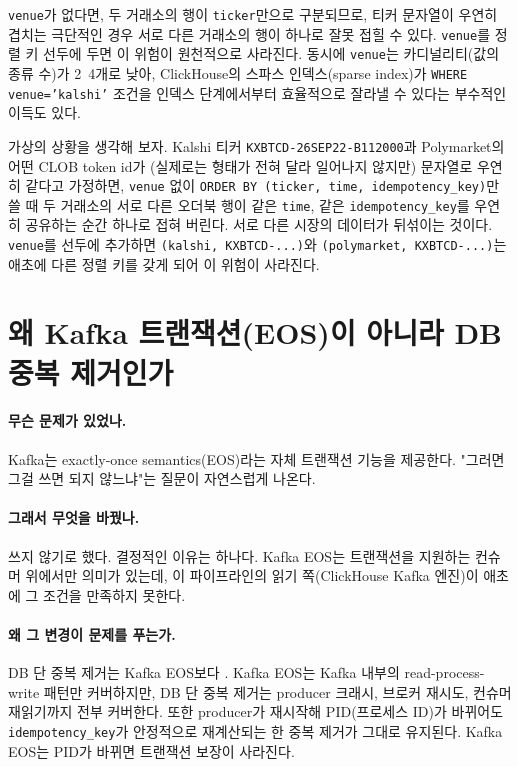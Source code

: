 \texttt{venue}가 없다면, 두 거래소의 행이 \texttt{ticker}만으로 구분되므로, 티커
문자열이 우연히 겹치는 극단적인 경우 서로 다른 거래소의 행이 하나로 잘못 접힐 수
있다. \texttt{venue}를 정렬 키 선두에 두면 이 위험이 원천적으로 사라진다. 동시에
\texttt{venue}는 카디널리티(값의 종류 수)가 2~4개로 낮아, ClickHouse의 스파스
인덱스(sparse index)가 \texttt{WHERE venue='kalshi'} 조건을 인덱스 단계에서부터
효율적으로 잘라낼 수 있다는 부수적인 이득도 있다.

\begin{example}
\label{ex:venue-collision}
가상의 상황을 생각해 보자. Kalshi 티커 \texttt{KXBTCD-26SEP22-B112000}과 Polymarket의
어떤 CLOB token id가 (실제로는 형태가 전혀 달라 일어나지 않지만) 문자열로 우연히
같다고 가정하면, \texttt{venue} 없이 \texttt{ORDER BY (ticker, time,
idempotency\_key)}만 쓸 때 두 거래소의 서로 다른 오더북 행이 같은 \texttt{time},
같은 \texttt{idempotency\_key}를 우연히 공유하는 순간 하나로 접혀 버린다. 서로
다른 시장의 데이터가 뒤섞이는 것이다. \texttt{venue}를 선두에 추가하면
\texttt{(kalshi, KXBTCD-...)}와 \texttt{(polymarket, KXBTCD-...)}는 애초에 다른
정렬 키를 갖게 되어 이 위험이 사라진다.
\end{example}

\section{왜 Kafka 트랜잭션(EOS)이 아니라 DB 중복 제거인가}
\label{sec:delivery-why-db}

\paragraph{무슨 문제가 있었나.} Kafka는 exactly-once semantics(EOS)라는 자체
트랜잭션 기능을 제공한다. "그러면 그걸 쓰면 되지 않느냐"는 질문이 자연스럽게
나온다.

\paragraph{그래서 무엇을 바꿨나.} 쓰지 않기로 했다. 결정적인 이유는 하나다.
 Kafka EOS는 트랜잭션을 지원하는 컨슈머 위에서만 의미가 있는데,
이 파이프라인의 읽기 쪽(ClickHouse Kafka 엔진)이 애초에 그 조건을 만족하지 못한다.

\paragraph{왜 그 변경이 문제를 푸는가.} DB 단 중복 제거는 Kafka EOS보다 . Kafka EOS는 Kafka 내부의 read-process-write 패턴만 커버하지만,
DB 단 중복 제거는 producer 크래시, 브로커 재시도, 컨슈머 재읽기까지  전부 커버한다. 또한 producer가 재시작해 PID(프로세스 ID)가 바뀌어도
\texttt{idempotency\_key}가 안정적으로 재계산되는 한 중복 제거가 그대로 유지된다.
Kafka EOS는 PID가 바뀌면 트랜잭션 보장이 사라진다.

